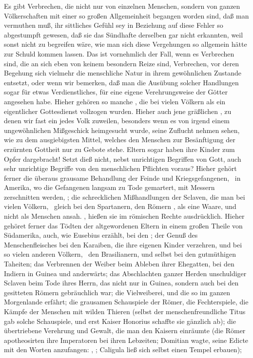\begin{aufza}
\item {}\par
Es gibt Verbrechen, die nicht nur von einzelnen Menschen, sondern von ganzen Völkerschaften mit einer so großen Allgemeinheit begangen worden sind, daß man vermuthen muß, ihr sittliches Gefühl sey in Beziehung auf diese Fehler so abgestumpft gewesen, daß sie das Sündhafte derselben gar nicht erkannten, weil sonst nicht zu begreifen wäre, wie man sich diese Vergehungen so allgemein hätte zur Schuld kommen lassen. Das ist vornehmlich der Fall, wenn es Verbrechen sind, die an sich eben von keinem besondern Reize sind, Verbrechen, vor deren Begehung sich vielmehr die menschliche Natur in ihrem gewöhnlichen Zustande entsetzt, oder wenn wir bemerken, daß man die Ausübung solcher Handlungen sogar für etwas Verdienstliches, für eine eigene Verehrungsweise der Götter angesehen habe. Hieher gehören so manche , die bei vielen Völkern als ein eigentlicher Gottesdienst vollzogen wurden. Hieher auch jene gräßlichen , zu denen wir fast ein jedes Volk zuweilen, besonders wenn es von irgend einem ungewöhnlichen Mißgeschick heimgesucht wurde, seine Zuflucht nehmen sehen, wie zu dem ausgiebigsten Mittel, welches den Menschen zur Besänftigung der erzürnten Gottheit nur zu Gebote stehe. Eltern sogar haben ihre Kinder zum Opfer dargebracht! Setzt dieß nicht, nebst unrichtigen Begriffen von Gott, auch sehr unrichtige Begriffe von den menschlichen Pflichten voraus? Hieher gehört ferner die überaus grausame Behandlung der Feinde und Kriegsgefangenen, \zB\ in Amerika, wo die Gefangenen langsam zu Tode gemartert, mit Messern zerschnitten werden, \usw; die schrecklichen Mißhandlungen der Sclaven, die man bei vielen Völkern, \zB\ gleich bei den Spartanern, den Römern \uA , als eine Waare, und nicht als Menschen ansah. , hießen sie im römischen Rechte ausdrücklich. Hieher gehöret ferner das Tödten der altgewordenen Eltern in einem großen Theile von Südamerika, auch, wie Eusebius erzählt, bei den ; der Genuß des Menschenfleisches bei den Karaiben, die ihre eigenen Kinder verzehren, und bei so vielen anderen Völkern, \zB\ den Brasilianern, und selbst bei den gutmüthigen Taheiten; das Verbrennen der Weiber beim Ableben ihrer Ehegatten, bei den Indiern in Guinea und anderwärts; das Abschlachten ganzer Herden unschuldiger Sclaven beim Tode ihres Herrn, das nicht nur in Guinea, sondern auch bei den gesitteten Römern gebräuchlich war; die Vielweiberei, und die so  im ganzen Morgenlande erfährt; die grausamen Schauspiele der Römer, die Fechterspiele, die Kämpfe der Menschen mit wilden Thieren (selbst der menschenfreundliche Titus gab solche Schauspiele, und erst Kaiser Honorius schaffte sie gänzlich ab); die übertriebene Verehrung und Gewalt, die man den Kaisern einräumte (die Römer apotheosirten ihre Imperatoren bei ihren Lebzeiten; Domitian wagte, seine Edicte mit den Worten anzufangen: , \usw; Caligula ließ sich selbst einen Tempel erbauen); \usw

\end{aufza}
